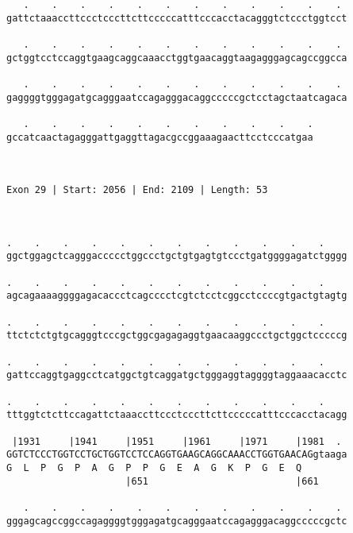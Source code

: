 \documentclass{article}
\begin{document}
\begin{Verbatim}
   .    .    .    .    .    .    .    .    .    .    .    . 
gattctaaaccttccctcccttcttcccccatttcccacctacagggtctccctggtcct
                                                            
   .    .    .    .    .    .    .    .    .    .    .    . 
gctggtcctccaggtgaagcaggcaaacctggtgaacaggtaagagggagcagccggcca
                                                            
   .    .    .    .    .    .    .    .    .    .    .    . 
gaggggtgggagatgcagggaatccagagggacaggcccccgctcctagctaatcagaca
                                                            
   .    .    .    .    .    .    .    .    .    .    .
gccatcaactagagggattgaggttagacgccggaaagaacttcctcccatgaa
                                                      
                                                      
 
Exon 29 | Start: 2056 | End: 2109 | Length: 53



.    .    .    .    .    .    .    .    .    .    .    .    
ggctggagctcagggaccccctggccctgctgtgagtgtccctgatggggagatctgggg
                                                            
.    .    .    .    .    .    .    .    .    .    .    .    
agcagaaaaggggagacaccctcagcccctcgtctcctcggcctccccgtgactgtagtg
                                                            
.    .    .    .    .    .    .    .    .    .    .    .    
ttctctctgtgcagggtcccgctggcgagagaggtgaacaaggccctgctggctcccccg
                                                            
.    .    .    .    .    .    .    .    .    .    .    .    
gattccaggtgaggcctcatggctgtcaggatgctgggaggtaggggtaggaaacacctc
                                                            
.    .    .    .    .    .    .    .    .    .    .    .    
tttggtctcttccagattctaaaccttccctcccttcttcccccatttcccacctacagg
                                                            
 |1931     |1941     |1951     |1961     |1971     |1981  . 
GGTCTCCCTGGTCCTGCTGGTCCTCCAGGTGAAGCAGGCAAACCTGGTGAACAGgtaaga
G  L  P  G  P  A  G  P  P  G  E  A  G  K  P  G  E  Q        
                     |651                          |661     
  
   .    .    .    .    .    .    .    .    .    .    .    . 
gggagcagccggccagaggggtgggagatgcagggaatccagagggacaggcccccgctc
                                                            

\end{Verbatim}
\end{document}
